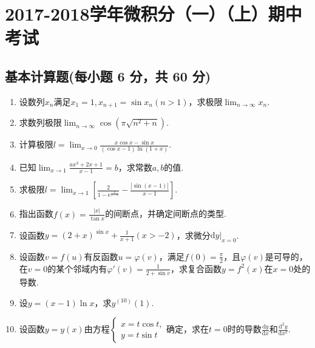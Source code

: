 \documentclass[../main.tex]{subfiles}
\begin{document}
\chapter{2017-2018学年微积分（一）（上）期中考试}

\section{基本计算题(每小题 6 分，共 60 分)}
\begin{enumerate}
    \item 设数列$x_{n}$满足$x_{1}=1,x_{n+1}=\sin x_{n}(n>1)$，求极限$\lim_{n\to\infty}
              x_{n}$.
          \vspace{11em}

    \item 求数列极限$\lim_{n\to \infty}\cos\left(\pi\sqrt{n^{2}+n}\right)$.
          \vspace{11em}

    \item 计算极限$l=\lim_{x\to 0}\frac{x\cos x-\sin x}{(\cos x-1)\ln(1+x)}$.
          \vspace{11em}

    \item 已知$\lim_{x\to1}\frac{ax^{3}+2x+1}{x-1}=b$，求常数$a,b$的值.
          \vspace{11em}

    \item 求极限$l=\lim_{x\to1}\left[\frac{2}{1-\mathrm{e}^{\frac{x}{1-x}}}-\frac{|\sin(x-1)|}{x-1}
                  \right]$.
          \vspace{9em}

    \item 指出函数$f(x)=\frac{|x|}{\tan x}$的间断点，并确定间断点的类型.
          \vspace{10em}

    \item 设函数$y=(2+x)^{\sin x}+\frac{1}{x+1}(x>-2)$，求微分$\left.\mathrm{d}y\right
              |_{x=0}$.
          \vspace{9em}

    \item 设函数$v=f(u)$有反函数$u=\varphi(v)$，满足$f(0)=\frac{\pi}{2}$，且$\varphi
              (v)$是可导的，在$v=0$的某个邻域内有$\varphi'(v)=\frac{1}{2+\sin v}$，求复合函数$y
              =f^{2}(x)$在$x=0$处的导数.
          \vspace{9em}

    \item 设$y=(x-1)\ln x$，求$y^{(10)}(1)$.
          \vspace{9em}

    \item 设函数$y=y(x)$由方程$\begin{cases}
                  x=t\cos t, \\
                  y=t\sin t
              \end{cases}$确定，求在$t=0$时的导数$\frac{\mathrm{d}y}{\mathrm{d}x}$和$\frac{\mathrm{d}^{2}y}{\mathrm{d}x^{2}}$.
          \vspace{9em}
\end{enumerate}
\end{document}
